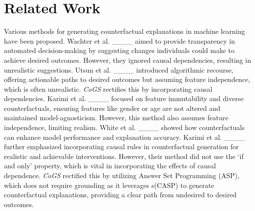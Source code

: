 \section{Related Work}
\vspace{-0.09 in}
Various methods for generating counterfactual explanations in machine learning have been proposed. Wachter et al. ____ aimed to provide transparency in automated decision-making by suggesting changes individuals could make to achieve desired outcomes. However, they ignored causal dependencies, resulting in unrealistic suggestions. Utsun et al. ____ introduced algorithmic recourse, offering actionable paths to desired outcomes but assuming feature independence, which is often unrealistic. \textit{CoGS} rectifies this by incorporating causal dependencies. Karimi et al. ____ focused on feature immutability and diverse counterfactuals, ensuring features like gender or age are not altered and maintained model-agnosticism. 
 However, this method also assumes feature independence, limiting realism.
White et al. ____ showed how counterfactuals can enhance model performance and explanation accuracy. Karimi et al. ____ further emphasized incorporating causal rules in counterfactual generation for realistic and achievable interventions. 
However, their method did not use the `if and only' property, which is vital in incorporating the effects of causal dependence. \textit{CoGS} rectified this by utilizing Answer Set Programming (ASP), which does not require grounding as it leverages s(CASP) to generate counterfactual explanations, providing a clear path from undesired to desired outcomes.

